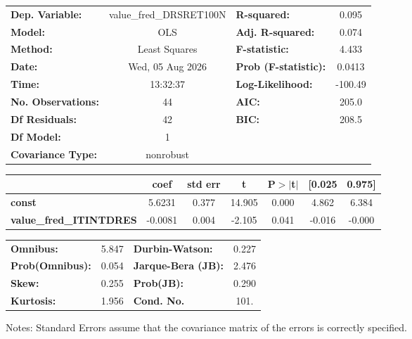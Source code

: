\begin{center}
\begin{tabular}{lclc}
\toprule
\textbf{Dep. Variable:}         & value\_fred\_DRSRET100N & \textbf{  R-squared:         } &     0.095   \\
\textbf{Model:}                 &           OLS           & \textbf{  Adj. R-squared:    } &     0.074   \\
\textbf{Method:}                &      Least Squares      & \textbf{  F-statistic:       } &     4.433   \\
\textbf{Date:}                  &     Wed, 05 Aug 2026    & \textbf{  Prob (F-statistic):} &   0.0413    \\
\textbf{Time:}                  &         13:32:37        & \textbf{  Log-Likelihood:    } &   -100.49   \\
\textbf{No. Observations:}      &              44         & \textbf{  AIC:               } &     205.0   \\
\textbf{Df Residuals:}          &              42         & \textbf{  BIC:               } &     208.5   \\
\textbf{Df Model:}              &               1         & \textbf{                     } &             \\
\textbf{Covariance Type:}       &        nonrobust        & \textbf{                     } &             \\
\bottomrule
\end{tabular}
\begin{tabular}{lcccccc}
                                & \textbf{coef} & \textbf{std err} & \textbf{t} & \textbf{P$> |$t$|$} & \textbf{[0.025} & \textbf{0.975]}  \\
\midrule
\textbf{const}                  &       5.6231  &        0.377     &    14.905  &         0.000        &        4.862    &        6.384     \\
\textbf{value\_fred\_ITINTDRES} &      -0.0081  &        0.004     &    -2.105  &         0.041        &       -0.016    &       -0.000     \\
\bottomrule
\end{tabular}
\begin{tabular}{lclc}
\textbf{Omnibus:}       &  5.847 & \textbf{  Durbin-Watson:     } &    0.227  \\
\textbf{Prob(Omnibus):} &  0.054 & \textbf{  Jarque-Bera (JB):  } &    2.476  \\
\textbf{Skew:}          &  0.255 & \textbf{  Prob(JB):          } &    0.290  \\
\textbf{Kurtosis:}      &  1.956 & \textbf{  Cond. No.          } &     101.  \\
\bottomrule
\end{tabular}
\end{center}

Notes: \newline
 [1] Standard Errors assume that the covariance matrix of the errors is correctly specified.